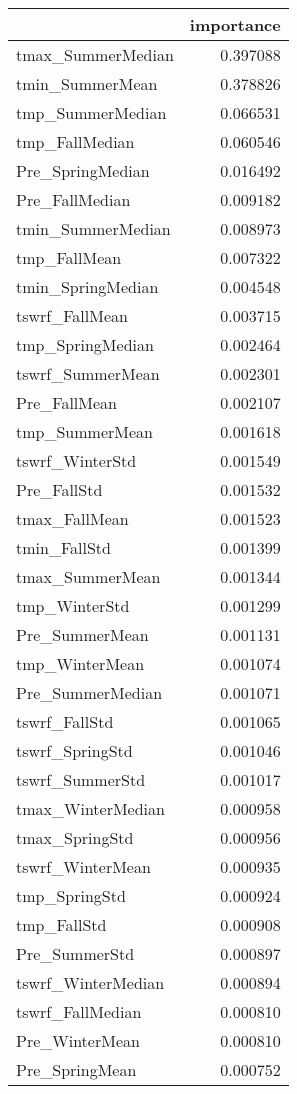 \begin{tabular}{lr}
\toprule
 & importance \\
\midrule
tmax_SummerMedian & 0.397088 \\
tmin_SummerMean & 0.378826 \\
tmp_SummerMedian & 0.066531 \\
tmp_FallMedian & 0.060546 \\
Pre_SpringMedian & 0.016492 \\
Pre_FallMedian & 0.009182 \\
tmin_SummerMedian & 0.008973 \\
tmp_FallMean & 0.007322 \\
tmin_SpringMedian & 0.004548 \\
tswrf_FallMean & 0.003715 \\
tmp_SpringMedian & 0.002464 \\
tswrf_SummerMean & 0.002301 \\
Pre_FallMean & 0.002107 \\
tmp_SummerMean & 0.001618 \\
tswrf_WinterStd & 0.001549 \\
Pre_FallStd & 0.001532 \\
tmax_FallMean & 0.001523 \\
tmin_FallStd & 0.001399 \\
tmax_SummerMean & 0.001344 \\
tmp_WinterStd & 0.001299 \\
Pre_SummerMean & 0.001131 \\
tmp_WinterMean & 0.001074 \\
Pre_SummerMedian & 0.001071 \\
tswrf_FallStd & 0.001065 \\
tswrf_SpringStd & 0.001046 \\
tswrf_SummerStd & 0.001017 \\
tmax_WinterMedian & 0.000958 \\
tmax_SpringStd & 0.000956 \\
tswrf_WinterMean & 0.000935 \\
tmp_SpringStd & 0.000924 \\
tmp_FallStd & 0.000908 \\
Pre_SummerStd & 0.000897 \\
tswrf_WinterMedian & 0.000894 \\
tswrf_FallMedian & 0.000810 \\
Pre_WinterMean & 0.000810 \\
Pre_SpringMean & 0.000752 \\

\end{tabular}
